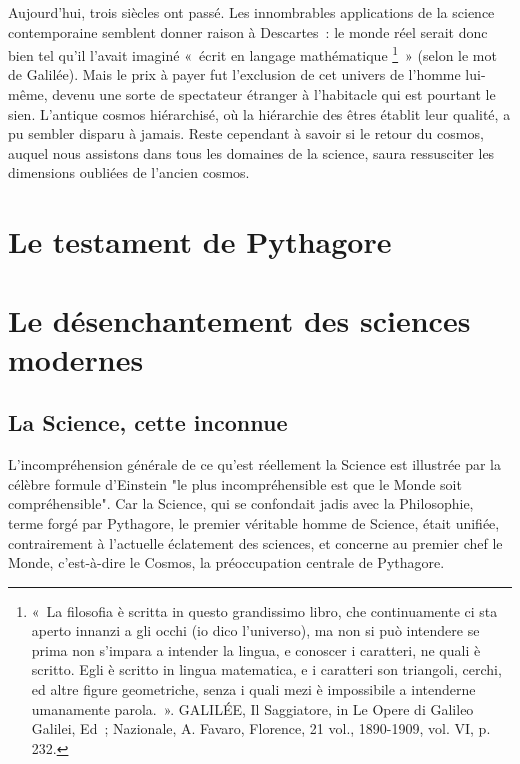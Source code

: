 \documentclass[a4paper,12pt]{article}
\begin{document}
Aujourd'hui, trois siècles ont passé. Les innombrables applications de la science contemporaine semblent donner raison à Descartes : le monde réel serait donc bien tel qu'il l'avait imaginé « écrit en langage mathématique \footnote{« La filosofia è scritta in questo grandissimo libro, che continuamente ci sta aperto innanzi a gli occhi (io dico l’universo), ma non si può intendere se prima non s’impara a intender la lingua, e conoscer i caratteri, ne quali è scritto. Egli è scritto in lingua matematica, e i caratteri son triangoli, cerchi, ed altre figure geometriche, senza i quali mezi è impossibile a intenderne umanamente parola. ». GALILÉE, Il Saggiatore, in Le Opere di Galileo Galilei, Ed ; Nazionale, A. Favaro, Florence, 21 vol., 1890-1909, vol. VI, p. 232.} » (selon le mot de Galilée). Mais le prix à payer fut l'exclusion de cet univers de l'homme lui-même, devenu une sorte de spectateur étranger à l'habitacle qui est pourtant le sien. L'antique cosmos hiérarchisé, où la hiérarchie des êtres établit leur qualité, a pu sembler disparu à jamais. Reste cependant à savoir si le retour du cosmos, auquel nous assistons dans tous les domaines de la science, saura ressusciter les dimensions oubliées de l'ancien cosmos.

\section{Le testament de Pythagore}











\section{Le désenchantement des sciences modernes}


\subsection{La Science, cette inconnue}

L'incompréhension générale de ce qu'est réellement la Science est illustrée par la célèbre formule d'Einstein "le plus incompréhensible est que le Monde soit compréhensible". Car la Science, qui se confondait jadis avec la Philosophie, terme forgé par Pythagore, le premier véritable homme de Science,  était unifiée, contrairement à l'actuelle éclatement des sciences, et concerne au premier chef le Monde, c'est-à-dire le Cosmos, la préoccupation centrale de Pythagore.
\end{document}
